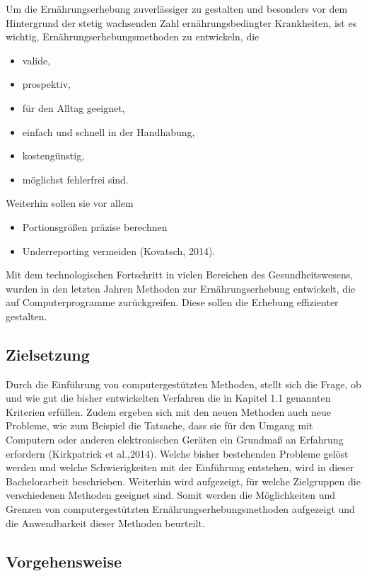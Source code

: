 Um die Ernährungserhebung zuverlässiger zu gestalten und besonders vor dem Hintergrund der stetig wachsenden Zahl ernährungsbedingter Krankheiten, ist es wichtig, Ernährungserhebungsmethoden zu entwickeln, die 
\begin{itemize}
\item valide,
\item prospektiv,
\item für den Alltag geeignet,
\item einfach und schnell in der Handhabung,
\item kostengünstig,
\item möglichst fehlerfrei sind.
\end{itemize}

Weiterhin sollen sie vor allem
\begin{itemize}
\item Portionsgrößen präzise berechnen
\item Underreporting vermeiden (Kovatsch, 2014).
\end{itemize}

Mit dem technologischen Fortschritt in vielen Bereichen des Gesundheitswesens, wurden in den letzten Jahren Methoden zur Ernährungserhebung entwickelt, die auf Computerprogramme zurückgreifen. Diese sollen die Erhebung effizienter gestalten. 


\subsection{Zielsetzung}

Durch die Einführung von computergestützten Methoden, stellt sich die Frage, ob und wie gut die bisher entwickelten Verfahren die in Kapitel 1.1 genannten Kriterien erfüllen. Zudem ergeben sich mit den neuen Methoden auch neue Probleme, wie zum Beispiel die Tatsache, dass sie für den Umgang mit Computern oder anderen elektronischen Geräten  ein Grundmaß an Erfahrung erfordern (Kirkpatrick et al.,2014). Welche bisher bestehenden Probleme gelöst werden und welche Schwierigkeiten mit der Einführung entstehen, wird in dieser Bachelorarbeit beschrieben. Weiterhin wird aufgezeigt, für welche Zielgruppen die verschiedenen Methoden geeignet sind.
Somit werden die Möglichkeiten und Grenzen von computergestützten Ernährungserhebungsmethoden aufgezeigt und die Anwendbarkeit dieser Methoden beurteilt. 

\subsection{Vorgehensweise}

